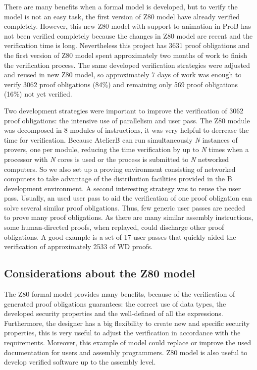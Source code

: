 \documentclass[a4paper]{llncs}
\begin{document}


There are many benefits when a formal model is developed, but to verify the
model is not an easy task, the first version of Z80 model have already verified
completely. However, this new Z80 model with support to animation in ProB has not
been verified completely because the changes in Z80 model are recent and the
verification time is long.
Nevertheless this project has 3631 proof obligations and the first version of
Z80 model spent approximately two months of work to finish the verification
process. The same  developed verification strategies were adjusted and reused in
new Z80 model, so approximately  7 days of work was enough to verify 3062  proof
obligations (84\%) and remaining only 569 proof obligations (16\%) not yet
verified.

Two development strategies were important to improve the verification of 3062
proof obligations: the intensive use of parallelism and user pass. The Z80 module
was decomposed in 8 modules of instructions, it was very helpful to decrease the
time for verification. Because AtelierB can run simultaneously \textit{N} instances of 
provers, one per module, reducing the time verification by up to \textit{N}  times when
a processor with \textit{N} cores is used  or the process is submitted to \textit{N} 
networked computers. So we also set up a proving environment consisting of networked
computers to take advantage of the distribution facilities provided in the B development
environment.
A second interesting strategy  was to reuse the user pass. Usually, an used
user pass to aid the verification of one proof obligation can solve several
similar proof obligations. Thus, few generic user passes are needed to prove many
proof obligations. As there are many similar assembly instructions, some
human-directed proofs, when replayed, could discharge other proof obligations. A
good example is a set of 17 user passes that quickly aided the verification of
approximately 2533 of WD proofs.


\subsection{Considerations about the Z80 model}


The Z80 formal model provides many benefits, because of the verification of
generated proof obligations guarantees: the correct use of data types, the developed
security properties  and the well-defined of all the expressions. 
Furthermore, the designer has a big flexibility to create new and specific security properties, this is very useful %
to adjust the verification in accordance with the requirements. Moreover, this
example of model could replace or improve the used documentation for users and
assembly programmers. Z80 model is also useful to develop verified software 
up to the assembly level.
\end{document}
